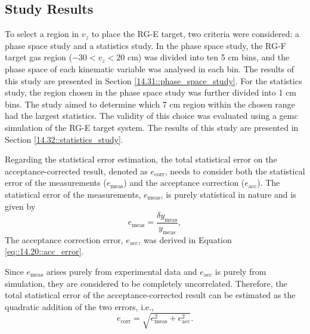 \subsection{Study Results}
\label{14.30::study_results}
    To select a region in $v_z$ to place the RG-E target, two criteria were considered: a phase space study and a statistics study.
    In the phase space study, the RG-F target gas region ($-30 < v_z < 20$ cm) was divided into ten 5 cm bins, and the phase space of each kinematic variable was analysed in each bin.
    The results of this study are presented in Section \ref{14.31::phase_space_study}.
    For the statistics study, the region chosen in the phase space study was further divided into 1 cm bins.
    The study aimed to determine which 7 cm region within the chosen range had the largest statistics.
    The validity of this choice was evaluated using a gemc simulation of the RG-E target system.
    The results of this study are presented in Section \ref{14.32::statistics_study}.

    Regarding the statistical error estimation, the total statistical error on the acceptance-corrected result, denoted as $e_\text{corr}$, needs to consider both the statistical error of the measurements ($e_\text{meas}$) and the acceptance correction ($e_\text{acc}$).
    The statistical error of the measurements, $e_\text{meas}$, is purely statistical in nature and is given by
    \begin{equation*}
        e_\text{meas} = \frac{\delta y_\text{meas}}{y_\text{meas}},
    \end{equation*}
    The acceptance correction error, $e_\text{acc}$, was derived in Equation \eqref{eq::14.20::acc_error}.

    Since $e_\text{meas}$ arises purely from experimental data and $e_\text{acc}$ is purely from simulation, they are considered to be completely uncorrelated.
    Therefore, the total statistical error of the acceptance-corrected result can be estimated as the quadratic addition of the two errors, i.e.,
    \begin{equation*}
        e_\text{corr} = \sqrt{e_\text{meas}^2 + e_\text{acc}^2}.
    \end{equation*}

    
    
    

